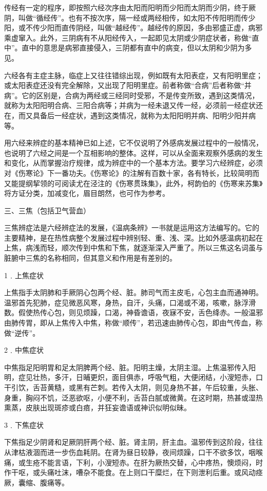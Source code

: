 \documentclass[12pt,UTF8]{ctexbook}
\begin{document}
传经有一定的程序，即按照六经次序由太阳而阳明而少阳而太阴而少阴，终于厥阴，叫做“循经传”。也有不按次序，隔一经或两经相传，如太阳不传阳明而传少阳，或不传少阳而直传阴经，叫做“越经传”。越经传的原因，多由邪盛正虚，病邪乘虚窜入。此外，三阴病有不从阳经传入，一起即见太阴或少阴症状者，称做“直中”。直中的意思是病邪直接侵入，三阴都有直中的病变，但以太阴和少阴为多见。

六经各有主症主脉，临症上又往往错综出现，例如既有太阳表症，又有阳明里症；或太阳表症还没有完全解除，又出现了阳明里症。前者称做“合病”后者称做“并病”。它的区别是，合病为两经或三经同时受邪，不是传变所致，遇到这类情况，就称为太阳阳明合病、三阳合病等；并病为一经未退又传一经，必须前一经症状还在，而又具备后一经症状，遇到这类情况，就称为太阳阳明并病、阳明少阳并病等。

用六经来辨症的基本精神已如上述，它不仅说明了外感病发展过程中的一般情况，也说明了六经之间是一个互相影响的整体。这样，可以从全面来观察外感病的发生和变化，从而掌握治疗规律，成为辨症中的一个基本方法。要学习六经辨症，必须对《伤寒论》下一番功夫。《伤寒论》的注解有百数十家，各有特长，比较简明而又能提纲挈领的可阅读尤在泾注的《伤寒贯珠集》，此外，柯韵伯的《伤寒来苏集》将方证分类，加减变化，眉目朗然，也可作为参考。

三、三焦（包括卫气营血）

三焦辨症法是六经辨症法的发展，《温病条辨》一书就是运用这方法编写的。它的主要精神，是在热性病整个发展过程中辨别轻、重、浅、深。比如外感温病初起在上焦，病浅而轻，顺次传到中焦和下焦，就逐渐深入严重了。所以三焦这名词虽与脏腑中三焦的名称相同，但其意义和作用是有差别的。

1﹒上焦症状

上焦指手太阴肺和手厥阴心包两个经、脏。肺司气而主皮毛，心包主血而通神明。温邪首先犯肺，症见微恶风寒，身热，自汗，头痛，口渴或不渴，咳嗽，脉浮滑数。假使热传心包，则见烦躁，口渴，神昏谵语，夜寐不安，舌色绛赤。一般温邪由肺传胃，即从上焦传入中焦，称做“顺传”，若迅速由肺传心包，即由气传血，称做“逆传”。

2﹒中焦症状

中焦指足阳明胃和足太阴脾两个经、脏。阳明主燥，太阴主湿。上焦温邪传入阳明，症见壮热，多汗，日晡更炽，面目俱赤，呼吸气粗，大便闭结，小溲短赤，口干引饮，舌苔黄糙，或黑有芒刺。若传入太阴，则见身热不甚，午后较重，头胀、身重，胸闷不饥，泛恶欲呕，小便不利，舌苔白腻或微黄。在这时期，热甚或湿热熏蒸，皮肤出现斑疹或白㾦，并狂妄谵语或神识似明似昧。

3﹒下焦症状

下焦指足少阴肾和足厥阴肝两个经、脏。肾主阴，肝主血。温邪传到这阶段，往往从津枯液涸而进一步伤血耗阴。在肾为昼日较静，夜间烦躁，口干不欲多饮，咽喉痛，或生疮不能言语，下利，小溲短赤。在肝为厥热交替，心中疼热，懊烦闷，时作干呕，或头痛吐沫，嘈杂不能食。在上则口干糜烂，在下则泄利后重。或风动痉厥，囊缩、腹痛等。
\end{document}
